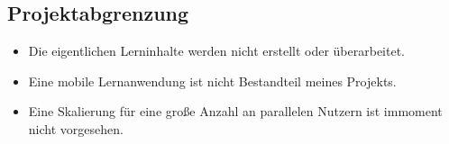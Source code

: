 \subsection{Projektabgrenzung}

\begin{itemize}[itemsep=0.4pt]
    \item Die eigentlichen Lerninhalte werden nicht erstellt oder überarbeitet.
    \item Eine mobile Lernanwendung ist nicht Bestandteil meines Projekts.
    \item Eine Skalierung für eine große Anzahl an parallelen Nutzern ist immoment nicht vorgesehen.
\end{itemize}